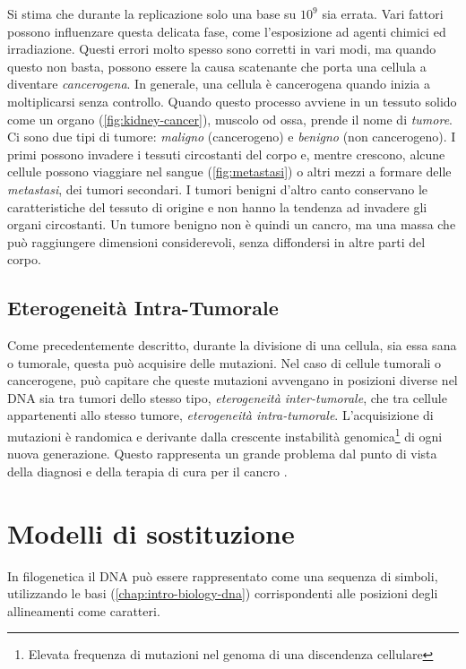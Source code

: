 Si stima che durante la replicazione solo una base su $10^9$ \cite{DNAReplication} sia errata. Vari fattori possono influenzare questa delicata fase, come l'esposizione ad agenti chimici ed irradiazione. Questi errori molto spesso sono corretti in vari modi, ma quando questo non basta, possono essere la causa scatenante che porta una cellula a diventare \textit{cancerogena}. In generale, una cellula è cancerogena quando inizia a moltiplicarsi senza controllo. Quando questo processo avviene in un tessuto solido come un organo (\autoref{fig:kidney-cancer}), muscolo od ossa, prende il nome di \textit{tumore}. Ci sono due tipi di tumore: \textit{maligno} (cancerogeno) e \textit{benigno} (non cancerogeno). I primi possono invadere i tessuti circostanti del corpo e, mentre crescono, alcune cellule possono viaggiare nel sangue (\autoref{fig:metastasi}) o altri mezzi a formare delle \textit{metastasi}, dei tumori secondari. I tumori benigni d'altro canto conservano le caratteristiche del tessuto di origine e non hanno la tendenza ad invadere gli organi circostanti. Un tumore benigno non è quindi un cancro, ma una massa che può raggiungere dimensioni considerevoli, senza diffondersi in altre parti del corpo.

\subsection{Eterogeneità Intra-Tumorale}
Come precedentemente descritto, durante la divisione di una cellula, sia essa sana o tumorale, questa può acquisire delle mutazioni. Nel caso di cellule tumorali o cancerogene, può capitare che queste mutazioni avvengano in posizioni diverse nel DNA sia tra tumori dello stesso tipo, \textit{eterogeneità inter-tumorale}, che tra cellule appartenenti allo stesso tumore, \textit{eterogeneità intra-tumorale}. L'acquisizione di mutazioni è randomica e derivante dalla crescente instabilità genomica\footnote{Elevata frequenza di mutazioni nel genoma di una discendenza cellulare} di ogni nuova generazione. Questo rappresenta un grande problema dal punto di vista della diagnosi e della terapia di cura per il cancro \cite{intratumoral}.

\section{Modelli di sostituzione}
\label{chap:intro-models}
In filogenetica il DNA può essere rappresentato come una sequenza di simboli, utilizzando le basi (\autoref{chap:intro-biology-dna}) corrispondenti alle posizioni degli allineamenti come caratteri.

